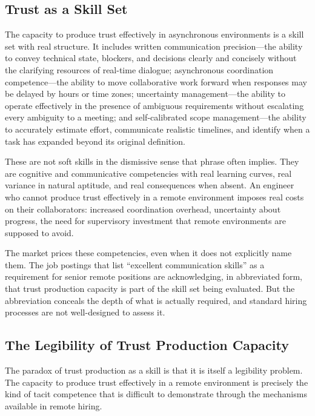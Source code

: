 \documentclass[12pt, a4paper]{article}
\theoremstyle{plain}
\theoremstyle{definition}
\theoremstyle{remark}
\begin{document}
\subsection{Trust as a Skill Set}

The capacity to produce trust effectively in asynchronous environments
is a skill set with real structure.
It includes written communication precision---the ability to convey technical state,
blockers, and decisions clearly and concisely without the clarifying resources
of real-time dialogue;
asynchronous coordination competence---the ability to move collaborative work forward
when responses may be delayed by hours or time zones;
uncertainty management---the ability to operate effectively in the presence of
ambiguous requirements without escalating every ambiguity to a meeting;
and self-calibrated scope management---the ability to accurately estimate
effort, communicate realistic timelines, and identify when a task has
expanded beyond its original definition.

These are not soft skills in the dismissive sense that phrase often implies.
They are cognitive and communicative competencies with real learning curves,
real variance in natural aptitude, and real consequences when absent.
An engineer who cannot produce trust effectively in a remote environment
imposes real costs on their collaborators: increased coordination overhead,
uncertainty about progress, the need for supervisory investment
that remote environments are supposed to avoid.

The market prices these competencies, even when it does not explicitly name them.
The job postings that list ``excellent communication skills''
as a requirement for senior remote positions are acknowledging,
in abbreviated form, that trust production capacity is part of the skill set
being evaluated.
But the abbreviation conceals the depth of what is actually required,
and standard hiring processes are not well-designed to assess it.

\subsection{The Legibility of Trust Production Capacity}

The paradox of trust production as a skill is that it is itself a legibility problem.
The capacity to produce trust effectively in a remote environment
is precisely the kind of tacit competence that is difficult to demonstrate
through the mechanisms available in remote hiring.
\end{document}
